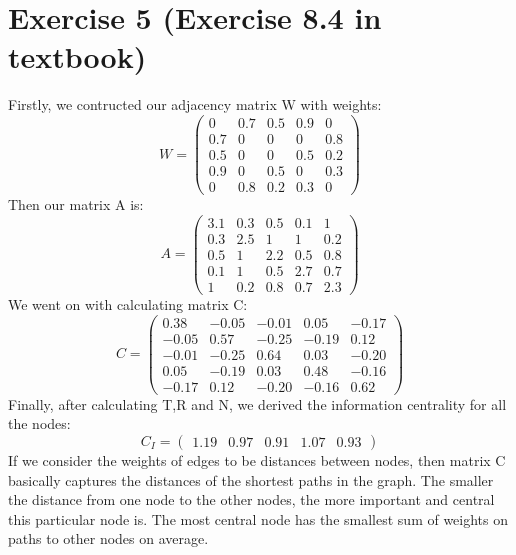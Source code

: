 \documentclass[12pt]{article}%
\begin{document}
\section{Exercise 5 (Exercise 8.4 in textbook)}
Firstly, we contructed our adjacency matrix W with weights:
$$W = \left(\begin{matrix} 0&0.7&0.5&0.9&0
\\0.7&0&0&0&0.8
\\0.5&0&0&0.5&0.2
\\0.9&0&0.5&0&0.3
\\0&0.8&0.2&0.3&0\end{matrix}\right)$$
Then our matrix A is:
$$A = \left(\begin{matrix} 3.1&0.3&0.5&0.1&1
\\0.3&2.5&1&1&0.2
\\0.5&1&2.2&0.5&0.8
\\0.1&1&0.5&2.7&0.7
\\1&0.2&0.8&0.7&2.3\end{matrix}\right)$$
We went on with calculating matrix C:
$$C = \left(\begin{matrix} 0.38&-0.05&-0.01&0.05&-0.17
\\-0.05&0.57&-0.25&-0.19&0.12
\\-0.01&-0.25&0.64&0.03&-0.20
\\0.05&-0.19&0.03&0.48&-0.16
\\-0.17&0.12&-0.20&-0.16&0.62\end{matrix}\right)$$
Finally, after calculating T,R and N, we derived the information centrality for all the nodes:
$$C_I = \left(\begin{matrix} 1.19&0.97&0.91&1.07&0.93\end{matrix}\right)$$
If we consider the weights of edges to be distances between nodes, then matrix C basically captures the distances of the shortest paths in the graph. The smaller the distance from one node to the other nodes, the more important and central this particular node is. The most central node has the smallest sum of weights on paths to other nodes on average.
\end{document}
